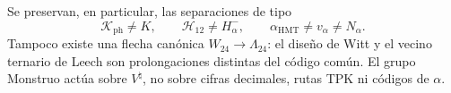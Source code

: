 Se preservan, en particular, las separaciones de tipo
\[
 \mathcal K_{\mathrm{ph}}\neq K,\qquad
 \mathcal H_{12}\neq H^-_\alpha,\qquad
 \alpha_{\mathrm{HMT}}\neq v_\alpha\neq N_\alpha.
\]
Tampoco existe una flecha canónica \(W_{24}\to\Lambda_{24}\): el diseño de
Witt y el vecino ternario de Leech son prolongaciones distintas del código
común. El grupo Monstruo actúa sobre \(V^\natural\), no sobre cifras decimales,
rutas TPK ni códigos de \(\alpha\).

